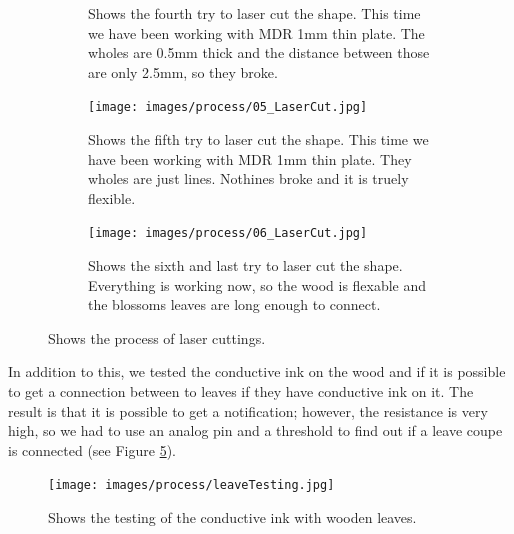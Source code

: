 \documentclass[00_doc.tex]{subfiles}
\begin{document}
\begin{figure}[H]
\begin{subfigure}{.45\textwidth}
            \caption{Shows the fourth try to laser cut the shape. This time we have been
                    working with MDR 1mm thin plate. The wholes are 0.5mm thick and the 
                    distance between those are only 2.5mm, so they broke.}
            \label{fig:04_LaserCut}
            \vspace{6mm}
        \end{subfigure}
        \hspace{1mm}
        \begin{subfigure}{.45\textwidth}
            \centering
            \texttt{[image: images/process/05\_LaserCut.jpg]}
            \caption{Shows the fifth try to laser cut the shape. This time we have been
                    working with MDR 1mm thin plate. They wholes are just lines. Nothines
                    broke and it is truely flexible. \cite{Festi2016}}
            \label{fig:04_LaserCut}
            \vspace{6mm}
        \end{subfigure}
        \hspace{1mm}
        \begin{subfigure}{.45\textwidth}
            \centering
            \texttt{[image: images/process/06\_LaserCut.jpg]}
            \caption{Shows the sixth and last try to laser cut the shape. Everything is 
            working now, so the wood is flexable and the blossoms leaves are long enough
            to connect. }
            \label{fig:04_LaserCut}
            \vspace{6mm}
        \end{subfigure}
        \caption{Shows the process of laser cuttings.}
        \label{fig:laserCutTests}
    \end{figure}

    \noindent
    In addition to this, we tested the conductive ink on the wood and if it is possible 
    to get a connection between to leaves if they have conductive ink on it. The result is
    that it is possible to get a notification; however, the resistance is very high, so we 
    had to use an analog pin and a threshold to find out if a leave coupe is connected
    (see Figure \ref{fig:leaveConductiveInk}).

    \begin{figure}[h!]
        \centering
        \texttt{[image: images/process/leaveTesting.jpg]}
        \caption{Shows the testing of the conductive ink with wooden leaves.}
        \label{fig:leaveConductiveInk}
    \end{figure}
\end{document}

